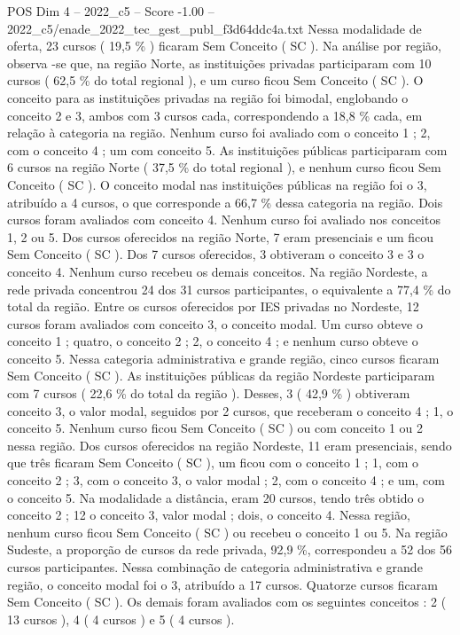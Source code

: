 \begin{textsample}{POS Dim 4 – 2022\_c5 – Score -1.00 – 2022\_c5/enade\_2022\_tec\_gest\_publ\_f3d64ddc4a.txt}
Nessa modalidade de oferta, 23 cursos ( 19,5 \% ) ficaram Sem Conceito ( SC ).
Na análise por região, observa -se que, na região Norte, as instituições privadas participaram com 10 cursos ( 62,5 \% do total regional ), e um curso ficou Sem Conceito ( SC ).
O conceito para as instituições privadas na região foi bimodal, englobando o conceito 2 e 3, ambos com 3 cursos cada, correspondendo a 18,8 \% cada, em relação à categoria na região.
Nenhum curso foi avaliado com o conceito 1 ; 2, com o conceito 4 ; um com conceito 5.
As instituições públicas participaram com 6 cursos na região Norte ( 37,5 \% do total regional ), e nenhum curso ficou Sem Conceito ( SC ).
O conceito modal nas instituições públicas na região foi o 3, atribuído a 4 cursos, o que corresponde a 66,7 \% dessa categoria na região.
Dois cursos foram avaliados com conceito 4.
Nenhum curso foi avaliado nos conceitos 1, 2 ou 5.
Dos cursos oferecidos na região Norte, 7 eram presenciais e um ficou Sem Conceito ( SC ).
Dos 7 cursos oferecidos, 3 obtiveram o conceito 3 e 3 o conceito 4.
Nenhum curso recebeu os demais conceitos.
Na região Nordeste, a rede privada concentrou 24 dos 31 cursos participantes, o equivalente a 77,4 \% do total da região.
Entre os cursos oferecidos por IES privadas no Nordeste, 12 cursos foram avaliados com conceito 3, o conceito modal.
Um curso obteve o conceito 1 ; quatro, o conceito 2 ; 2, o conceito 4 ; e nenhum curso obteve o conceito 5.
Nessa categoria administrativa e grande região, cinco cursos ficaram Sem Conceito ( SC ).
As instituições públicas da região Nordeste participaram com 7 cursos ( 22,6 \% do total da região ).
Desses, 3 ( 42,9 \% ) obtiveram conceito 3, o valor modal, seguidos por 2 cursos, que receberam o conceito 4 ; 1, o conceito 5.
Nenhum curso ficou Sem Conceito ( SC ) ou com conceito 1 ou 2 nessa região.
Dos cursos oferecidos na região Nordeste, 11 eram presenciais, sendo que três ficaram Sem Conceito ( SC ), um ficou com o conceito 1 ; 1, com o conceito 2 ; 3, com o conceito 3, o valor modal ; 2, com o conceito 4 ; e um, com o conceito 5.
Na modalidade a distância, eram 20 cursos, tendo três obtido o conceito 2 ; 12 o conceito 3, valor modal ; dois, o conceito 4.
Nessa região, nenhum curso ficou Sem Conceito ( SC ) ou recebeu o conceito 1 ou 5.
Na região Sudeste, a proporção de cursos da rede privada, 92,9 \%, correspondeu a 52 dos 56 cursos participantes.
Nessa combinação de categoria administrativa e grande região, o conceito modal foi o 3, atribuído a 17 cursos.
Quatorze cursos ficaram Sem Conceito ( SC ).
Os demais foram avaliados com os seguintes conceitos : 2 ( 13 cursos ), 4 ( 4 cursos ) e 5 ( 4 cursos ).

\end{textsample}
